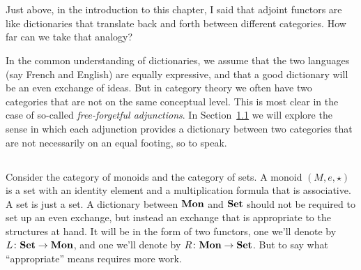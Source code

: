 \documentclass[CT4S-EN-RU]{subfiles}
\begin{document}
\section{}

\begin{blockENG}
Just above, in the introduction to this chapter, I said that adjoint functors are like dictionaries that translate back and forth between different categories. How far can we take that analogy?
\end{blockENG}

\begin{blockRUS}
\end{blockRUS}

\begin{blockENG}
In the common understanding of dictionaries, we assume that the two languages (say French and English) are equally expressive, and that a good dictionary will be an even exchange of ideas. But in category theory we often have two categories that are not on the same conceptual level. This is most clear in the case of so-called {\em free-forgetful adjunctions}. In Section~\ref{sec:adjoints discuss and define} we will explore the sense in which each adjunction provides a dictionary between two categories that are not necessarily on an equal footing, so to speak.
\end{blockENG}

\begin{blockRUS}
\end{blockRUS}


\subsection{}\label{sec:adjoints discuss and define}

\begin{blockENG}
Consider the category of monoids and the category of sets. A monoid $(M,e,\star)$ is a set with an identity element and a multiplication formula that is associative. A set is just a set. A dictionary between ${\mathbf{Mon}}$ and ${\mathbf{Set}}$ should not be required to set up an even exchange, but instead an exchange that is appropriate to the structures at hand. It will be in the form of two functors, one we'll denote by $L\colon{\mathbf{Set}}\rightarrow{\mathbf{Mon}}$, and one we'll denote by $R\colon{\mathbf{Mon}}\rightarrow{\mathbf{Set}}$. But to say what “appropriate” means requires more work.
\end{blockENG}
\end{document}

